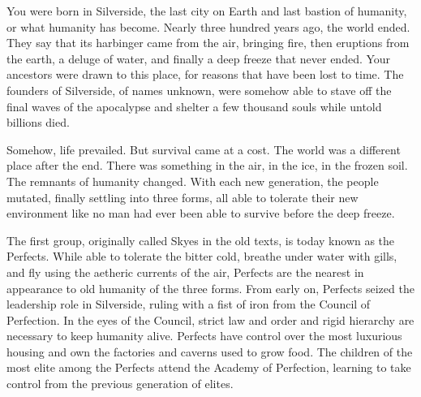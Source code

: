 \documentclass[blue]{Silversiders}
\begin{document}
\name{\bSilversideCity{}}

You were born in Silverside, the last city on Earth and last bastion of humanity, or what humanity has become. Nearly three hundred years ago, the world ended. They say that its harbinger came from the air, bringing fire, then eruptions from the earth, a deluge of water, and finally a deep freeze that never ended. Your ancestors were drawn to this place, for reasons that have been lost to time. The founders of Silverside, of names unknown, were somehow able to stave off the final waves of the apocalypse and shelter a few thousand souls while untold billions died.

Somehow, life prevailed. But survival came at a cost. The world was a different place after the end. There was something in the air, in the ice, in the frozen soil. The remnants of humanity changed. With each new generation, the people mutated, finally settling into three forms, all able to tolerate their new environment like no man had ever been able to survive before the deep freeze.

The first group, originally called Skyes in the old texts, is today known as the Perfects. While able to tolerate the bitter cold, breathe under water with gills, and fly using the aetheric currents of the air, Perfects are the nearest in appearance to old humanity of the three forms. From early on, Perfects seized the leadership role in Silverside, ruling with a fist of iron from the Council of Perfection. In the eyes of the Council, strict law and order and rigid hierarchy are necessary to keep humanity alive. Perfects have control over the most luxurious housing and own the factories and caverns used to grow food. The children of the most elite among the Perfects attend the Academy of Perfection, learning to take control from the previous generation of elites.
\end{document}
